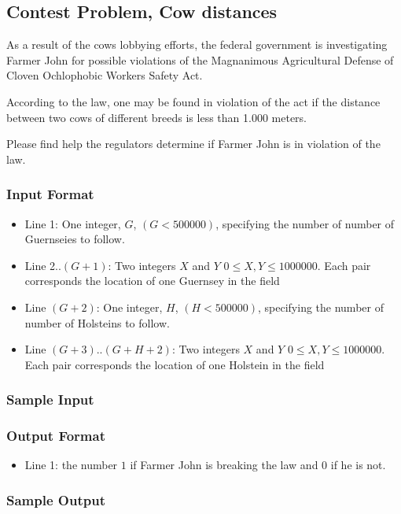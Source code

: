 \subsection{Contest Problem, Cow distances}
As a result of the cows lobbying efforts,  the federal government is investigating Farmer John for possible violations of the Magnanimous Agricultural Defense of Cloven Ochlophobic Workers Safety Act.

According to the law, one may be found in violation of the act if the distance between two cows of different breeds is less than 1.000 meters.

Please find help the regulators determine if Farmer John is in violation of the law.

\subsubsection{Input Format}
\begin{itemize}
	\item Line 1: One integer, $G$, $(G < 500000)$, specifying the number of number of Guernseies to follow.
	\item Line 2..$(G+1)$: Two integers $X$ and $Y$ $0 \leq X,Y \leq 1000000$.
		Each pair corresponds the location of one Guernsey in the field
	\item Line $(G+2)$: One integer, $H$, $(H < 500000)$, specifying the number of number of Holsteins to follow. 
	\item Line $(G+3)$..$(G+H+2)$: Two integers $X$ and $Y$ $0 \leq X,Y \leq 1000000$.
		Each pair corresponds the location of one Holstein in the field
\end{itemize}

\subsubsection{Sample Input}


\subsubsection{Output Format}
\begin{itemize}
  \item Line 1: the number $1$ if Farmer John is breaking the law and $0$ if he is not.
\end{itemize}

\subsubsection{Sample Output}


